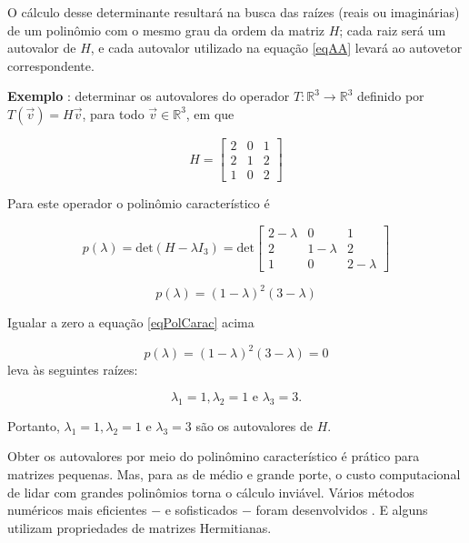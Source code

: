 	O cálculo desse determinante resultará na busca das raízes (reais ou imaginárias) de um polinômio com o mesmo grau da ordem da matriz $H$; cada raiz será um autovalor de $H$, e cada autovalor utilizado na equação \ref{eqAA} levará ao autovetor correspondente.
	
	\textbf{Exemplo} \cite{Santos2010}: determinar os autovalores do operador $T: \mathbb{R}^3 \rightarrow \mathbb{R}^3$ definido por $T(\vec{v}) = H\vec{v}$, para todo $\vec{v} \in \mathbb{R}^3$, em que
		
		\begin{equation}
			H=\left[\begin{array}{rrr}
								2		&		0		&		1		\\
								2		&		1		&		2		\\
								1		&		0		&		2								
							\end{array}\right]
		\end{equation}
		
		Para este operador o polinômio característico é
		
		$$
			p(\lambda) = \mbox{det}(H - \lambda I_3) = \mbox{det}\left[\begin{array}{rrr}
						2	-\lambda	&		0						&		1		\\
						2						&		1	-\lambda	&		2		\\
						1						&		0						&		2	-\lambda							
						\end{array}\right]
		$$
		
		\begin{equation}\label{eqPolCarac}
			p(\lambda) = (1 - \lambda)^2 (3 - \lambda)
		\end{equation}
	
	Igualar a zero a equação \ref{eqPolCarac} acima
	
		\begin{equation}\label{eqIgualAZero}
			p(\lambda) = (1 - \lambda)^2 (3 - \lambda) = 0
		\end{equation}
		leva às seguintes raízes:
		
		\begin{equation}\label{autovaloresExemplo}
			\lambda_1 = 1, \lambda_2 = 1 \mbox{ e } \lambda_3 = 3.
		\end{equation}
		
		Portanto, $\lambda_1 = 1, \lambda_2 = 1 \mbox{ e } \lambda_3 = 3$ são os autovalores de $H$.
		
		Obter os autovalores por meio do polinômino característico é prático para matrizes pequenas. Mas, para as de médio e grande porte, o custo computacional de lidar com grandes polinômios torna o cálculo inviável. Vários métodos numéricos mais eficientes $-$ e sofisticados $-$ foram desenvolvidos \cite{Wilkinson1965, Parlett1998}. E alguns utilizam propriedades de matrizes Hermitianas.

